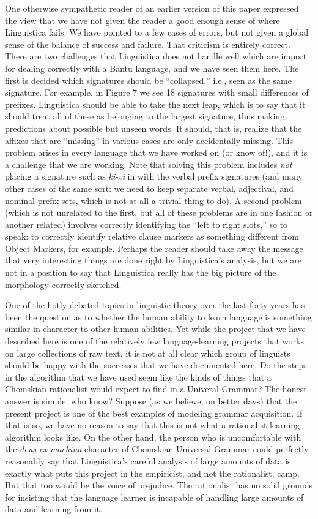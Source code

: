 \documentclass[output=paper,colorlinks,citecolor=brown,
]{langscibook}
\begin{document}
One otherwise sympathetic reader of an earlier version of this paper expressed the view that we have not given the reader a good enough sense of where Linguistica fails. We have pointed to a few cases of errors, but not given a global sense of the balance of success and failure.  That criticism is entirely correct. There are two challenges that Linguistica does not handle well which are import for dealing correctly with a Bantu language, and we have seen them here. The first is decided which signatures should be ``collapsed,'' i.e., seen as the same signature. For example, in Figure 7 we see 18 signatures with small differences of prefixes. Linguistica should be able to take the next leap, which is to say that it should treat all of these as belonging to the largest signature, thus making predictions about possible but unseen words. It should, that is, realize that the affixes that are ``missing'' in various cases are only accidentally missing. This problem arises in every language that we have worked on (or know of!), and it is a challenge that we are working. Note that solving this problem includes {\em not} placing a signature such as {\em ki-vi} in with the verbal prefix signatures (and many other cases of the same sort: we need to keep separate verbal, adjectival, and nominal prefix sets, which is not at all a trivial thing to do). A second problem (which is not unrelated to the first, but all of these problems are in one fashion or another related) involves correctly identifying the ``left to right slots,'' so to speak: to correctly identify relative clause markers as something different from Object Markers, for example. Perhaps the reader should take away the message that very interesting things are done right by Linguistica's analysis, but we are not in a position to say that Linguistica really has the big picture of the morphology correctly sketched. 

One of the hotly debated topics in linguistic theory over the last forty years has been the question as to whether the human ability to learn language is something similar in character to other human abilities. Yet while the project that we have described here is one of the relatively few language-learning projects that works on large collections of raw text, it is not at all clear which group of linguists should be happy with the successes that we have documented here. Do the steps in the algorithm that we have used seem like the kinds of things that a Chomskian rationalist would expect to find in a Univeral Grammar? The honest answer is simple: who know? Suppose (as we believe, on better days) that the present project is one of the best examples of modeling grammar acquisition. If that is so, we have no reason to say that this is not what a rationalist learning algorithm looks like. On the other hand, the person who is uncomfortable with the \textit{deus ex machina} character of Chomskian Universal Grammar could perfectly reasonably say that Linguistica's careful analysis of large amounts of data is exactly what puts this project in the empiricist, and not the rationalist, camp. But that too would be the voice of prejudice. The rationalist has no solid grounds for insisting that the language learner is incapable of handling large amounts of data and learning from it. 
\end{document}
